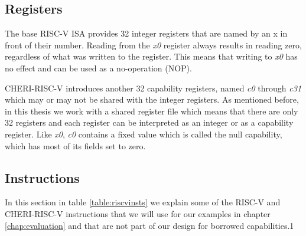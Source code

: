 \subsection{Registers}
The base RISC-V ISA provides 32 integer registers that are named by an x in front of their number.
Reading from the \textit{x0} register always results in reading zero, regardless of what was written to the register.
This means that writing to \textit{x0} has no effect and can be used as a no-operation (NOP).

CHERI-RISC-V introduces another 32 capability registers, named \textit{c0} through \textit{c31} which may or may not be shared with the integer registers.
As mentioned before, in this thesis we work with a shared register file which means that there are only 32 registers and each register can be interpreted as an integer or as a capability register.
Like \textit{x0}, \textit{c0} contains a fixed value which is called the null capability, which has most of its fields set to zero.

\subsection{Instructions}
In this section in table \ref{table:riscvinsts} we explain some of the RISC-V and CHERI-RISC-V instructions that we will use for our examples in chapter \ref{chap:evaluation} and that are not part of our design for borrowed capabilities.1

